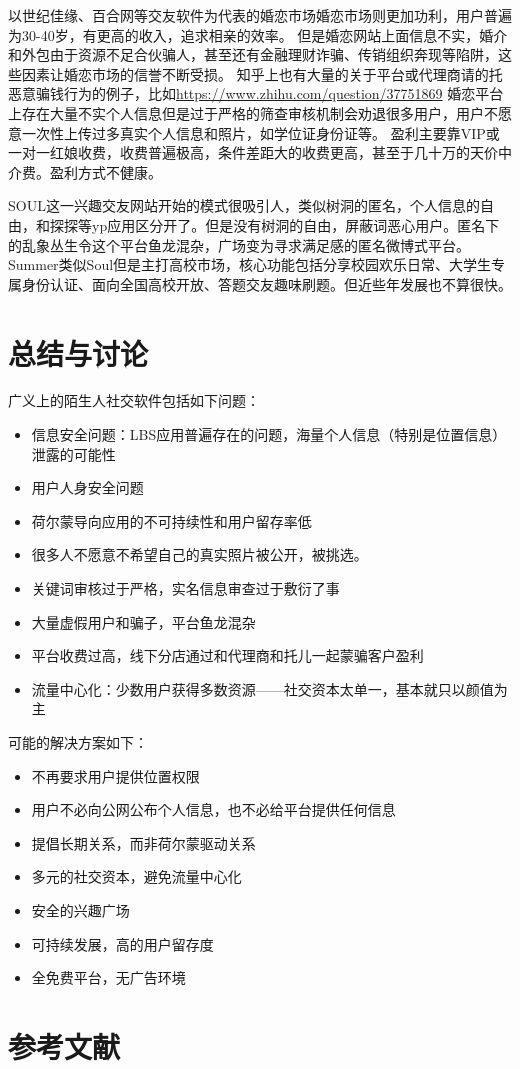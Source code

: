 \documentclass[UTF8]{ctexart}
\begin{document}
以世纪佳缘、百合网等交友软件为代表的婚恋市场婚恋市场则更加功利，用户普遍为30-40岁，有更高的收入，追求相亲的效率。
但是婚恋网站上面信息不实，婚介和外包由于资源不足合伙骗人，甚至还有金融理财诈骗、传销组织奔现等陷阱，这些因素让婚恋市场的信誉不断受损。\cite{CheatTheLiving}
知乎上也有大量的关于平台或代理商请的托恶意骗钱行为的例子，比如\url{https://www.zhihu.com/question/37751869}
婚恋平台上存在大量不实个人信息但是过于严格的筛查审核机制会劝退很多用户，用户不愿意一次性上传过多真实个人信息和照片，如学位证身份证等。\cite{WikiJiayuan}
盈利主要靠VIP或一对一红娘收费，收费普遍极高，条件差距大的收费更高，甚至于几十万的天价中介费。盈利方式不健康。

SOUL这一兴趣交友网站开始的模式很吸引人，类似树洞的匿名，个人信息的自由，和探探等yp应用区分开了。但是没有树洞的自由，屏蔽词恶心用户。匿名下的乱象丛生令这个平台鱼龙混杂，广场变为寻求满足感的匿名微博式平台。\cite{Soul}
Summer类似Soul但是主打高校市场，核心功能包括分享校园欢乐日常、大学生专属身份认证、面向全国高校开放、答题交友趣味刷题。但近些年发展也不算很快。

\section{总结与讨论}

广义上的陌生人社交软件包括如下问题：

\begin{itemize}
    \item 信息安全问题：LBS应用普遍存在的问题，海量个人信息（特别是位置信息）泄露的可能性
    \item 用户人身安全问题
    \item 荷尔蒙导向应用的不可持续性和用户留存率低
    \item 很多人不愿意不希望自己的真实照片被公开，被挑选。
    \item 关键词审核过于严格，实名信息审查过于敷衍了事
    \item 大量虚假用户和骗子，平台鱼龙混杂
    \item 平台收费过高，线下分店通过和代理商和托儿一起蒙骗客户盈利
    \item 流量中心化：少数用户获得多数资源——社交资本太单一，基本就只以颜值为主
\end{itemize}

可能的解决方案如下：

\begin{itemize}
    \item 不再要求用户提供位置权限
    \item 用户不必向公网公布个人信息，也不必给平台提供任何信息
    \item 提倡长期关系，而非荷尔蒙驱动关系
    \item 多元的社交资本，避免流量中心化
    \item 安全的兴趣广场
    \item 可持续发展，高的用户留存度
    \item 全免费平台，无广告环境
\end{itemize}

\section{参考文献}



\end{document}
